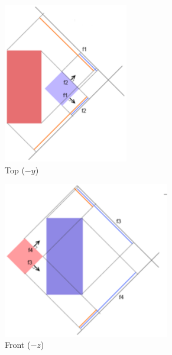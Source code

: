 \documentclass[a4paper]{article}
\begin{document}
\begin{figure}[h]
  \begin{subfigure}[b]{0.32\textwidth}
    \centering
    \includegraphics[width=0.6\textwidth]{graphics/colldet_sat_3d_top.eps}
    \caption{Top ($-y$)}
  \end{subfigure}
  \begin{subfigure}[b]{0.32\textwidth}
    \centering
    \includegraphics[width=0.8\textwidth]{graphics/colldet_sat_3d_front.eps}
    \caption{Front ($-z$)}
  \end{subfigure}
  \begin{subfigure}[b]{0.32\textwidth}
    \centering

\end{subfigure}
\end{figure}
\end{document}
